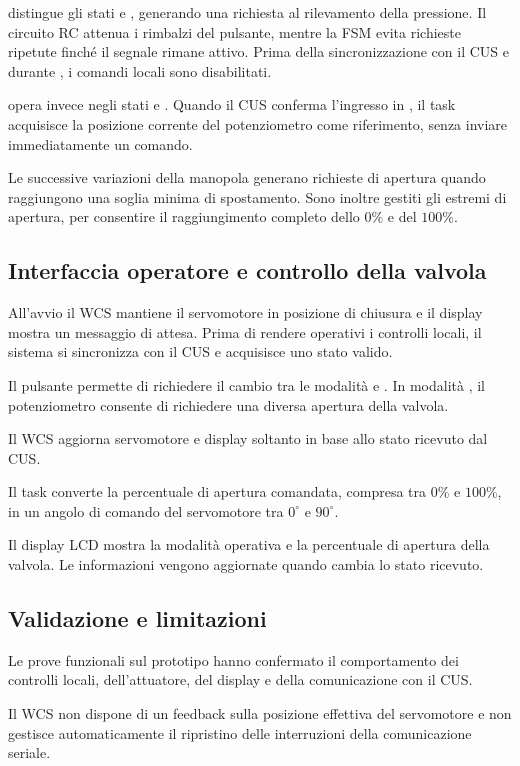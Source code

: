  distingue gli stati  e , generando una richiesta al rilevamento della pressione.
Il circuito RC attenua i rimbalzi del pulsante, mentre la FSM evita richieste ripetute finché il segnale rimane attivo.
Prima della sincronizzazione con il CUS e durante , i comandi locali sono disabilitati.

 opera invece negli stati  e .
Quando il CUS conferma l'ingresso in , il task acquisisce la posizione corrente del potenziometro come riferimento, senza inviare immediatamente un comando.

Le successive variazioni della manopola generano richieste di apertura quando raggiungono una soglia minima di spostamento.
Sono inoltre gestiti gli estremi di apertura, per consentire il raggiungimento completo dello \(0\%\) e del \(100\%\).

\FloatBarrier%


\subsection{Interfaccia operatore e controllo della valvola}%
\label{subsec:wcs-interface}

All'avvio il WCS mantiene il servomotore in posizione di chiusura e il display mostra un messaggio di attesa.
Prima di rendere operativi i controlli locali, il sistema si sincronizza con il CUS e acquisisce uno stato valido.

Il pulsante permette di richiedere il cambio tra le modalità  e .
In modalità , il potenziometro consente di richiedere una diversa apertura della valvola.

Il WCS aggiorna servomotore e display soltanto in base allo stato ricevuto dal CUS.

Il task  converte la percentuale di apertura comandata, compresa tra \(0\%\) e \(100\%\), in un angolo di comando del servomotore tra \(0^\circ\) e \(90^\circ\).

Il display LCD mostra la modalità operativa e la percentuale di apertura della valvola.
Le informazioni vengono aggiornate quando cambia lo stato ricevuto.


\subsection{Validazione e limitazioni}

Le prove funzionali sul prototipo hanno confermato il comportamento dei controlli locali, dell'attuatore, del display e della comunicazione con il CUS.

Il WCS non dispone di un feedback sulla posizione effettiva del servomotore e non gestisce automaticamente il ripristino delle interruzioni della comunicazione seriale.
